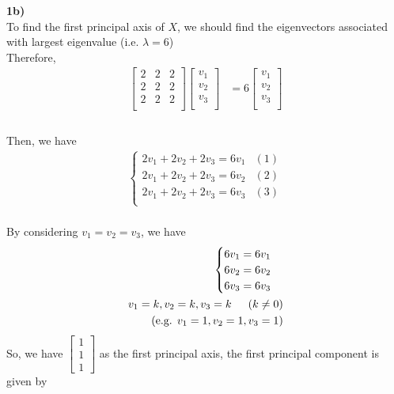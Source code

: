 \documentclass[12pt]{article}
\begin{document}
\newpage
{}
\textbf{1b)}\\
To find the first principal axis of $X$, we should find the eigenvectors associated with largest eigenvalue (i.e. $\lambda = 6$)\\
Therefore,\\
\begin{align*}
\begin{bmatrix}
2 & 2 & 2\\
2 & 2 & 2\\
2 & 2 & 2\\
\end{bmatrix} \begin{bmatrix}
v_{1}\\
v_{2}\\
v_{3}\\
\end{bmatrix} &= 6 \begin{bmatrix}
v_{1}\\
v_{2}\\
v_{3}\\
\end{bmatrix}\\
\end{align*}\\
Then, we have
\begin{align*}
\begin{cases}
2v_{1} + 2v_{2} + 2v_{3} = 6v_{1} & (1)\\
2v_{1} + 2v_{2} + 2v_{3} = 6v_{2} & (2)\\
2v_{1} + 2v_{2} + 2v_{3} = 6v_{3} & (3)\\
\end{cases}
\end{align*}\\
By considering $v_{1} = v_{2} = v_{3}$, we have
\begin{align*}
\begin{cases}
6v_{1} = 6v_{1}\\
6v_{2} = 6v_{2}\\
6v_{3} = 6v_{3}\\
\end{cases}\\
v_{1} = k, v_{2} = k,  v_{3} = k  \indent (k \neq 0)\\
(\text{e.g.   } v_{1} = 1, v_{2} = 1,  v_{3} = 1)\\
\end{align*}
So, we have $\begin{bmatrix}
1 \\ 1 \\ 1
\end{bmatrix}$ as the first principal axis, the first principal component is given by\\
\end{document}
